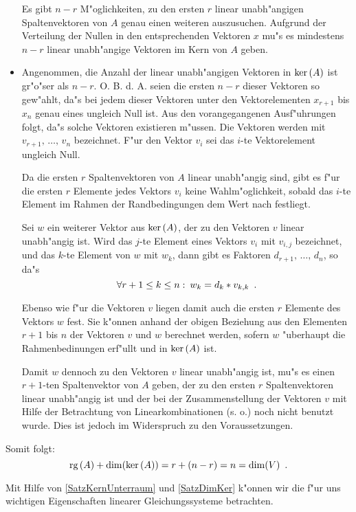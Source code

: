 \begin{beweis}
\begin{itemize}
          Es gibt $n-r$ M"oglichkeiten,
          zu den ersten $r$ linear unabh"angigen Spaltenvektoren von $A$
          genau einen weiteren
          auszusuchen. Aufgrund der Verteilung der Nullen in den 
          entsprechenden Vektoren $x$ mu"s es mindestens $n-r$ linear 
          unabh"angige Vektoren im Kern von $A$ geben.
    \item 
          Angenommen, die Anzahl der linear unabh"angigen Vektoren 
          in $\mbox{\rm ker} \,(A)$ ist gr"o"ser als $n-r$. O. B. d. A. seien die 
          ersten $n-r$ dieser Vektoren
          so gew"ahlt, da"s bei jedem dieser Vektoren unter den
          Vektorelementen $x_{r+1}$ bis $x_n$ genau eines ungleich Null ist.
          Aus den vorangegangenen Ausf"uhrungen folgt, da"s solche
          Vektoren existieren m"ussen. Die Vektoren werden mit 
          $v_{r+1}, \, \ldots, \, v_n$ bezeichnet. F"ur den Vektor $v_i$
          sei das $i$-te Vektorelement ungleich Null.
          
          Da die ersten $r$ Spaltenvektoren von $A$ linear unabh"angig sind,
          gibt es f"ur die ersten $r$ Elemente jedes Vektors $v_i$
          keine Wahlm"oglichkeit, sobald das $i$-te Element im
          Rahmen der Randbedingungen dem Wert nach festliegt.

          Sei $w$ ein weiterer Vektor aus $\mbox{\rm ker} \,(A)$, der zu den Vektoren
          $v$ linear unabh"angig ist. Wird das $j$-te Element eines Vektors
          $v_i$ mit $v_{i,j}$ bezeichnet, und das $k$-te Element von $w$
          mit $w_k$, dann gibt es Faktoren $d_{r+1}, \, \ldots , \, d_n$,
          so da"s
          \[ \forall r+1 \leq k \leq n : \: w_k = d_k * v_{k,k} \mbox{\hspace{0.5em}.} \]
          
          Ebenso wie f"ur die Vektoren $v$ liegen damit auch die
          ersten $r$ Elemente des Vektors $w$ fest. Sie k"onnen anhand
          der obigen Beziehung aus den Elementen $r+1$ bis $n$ der
          Vektoren $v$ und $w$ berechnet werden, sofern $w$ "uberhaupt die
          Rahmenbedinungen erf"ullt und in $\mbox{\rm ker} \,(A)$ ist.

          Damit $w$ dennoch zu den Vektoren $v$ linear unabh"angig ist,
          mu"s es einen $r+1$-ten Spaltenvektor von $A$ geben, der zu den
          ersten $r$ Spaltenvektoren linear unabh"angig ist und der
          bei der Zusammenstellung der Vektoren $v$ mit Hilfe der
          Betrachtung von Linearkombinationen (s. o.) noch nicht benutzt
          wurde. Dies ist jedoch im Widerspruch zu den Voraussetzungen.
    \end{itemize}
    Somit folgt:
    \[ \mbox{\rm rg} \,(A) + \dim(\mbox{\rm ker} \,(A)) = r + (n-r) = n = \dim(V) \mbox{\hspace{0.5em}.} \]
\end{beweis}
Mit Hilfe von \ref{SatzKernUnterraum} und \ref{SatzDimKer} k"onnen wir
die f"ur uns wichtigen Eigenschaften linearer Gleichungssysteme
betrachten.

